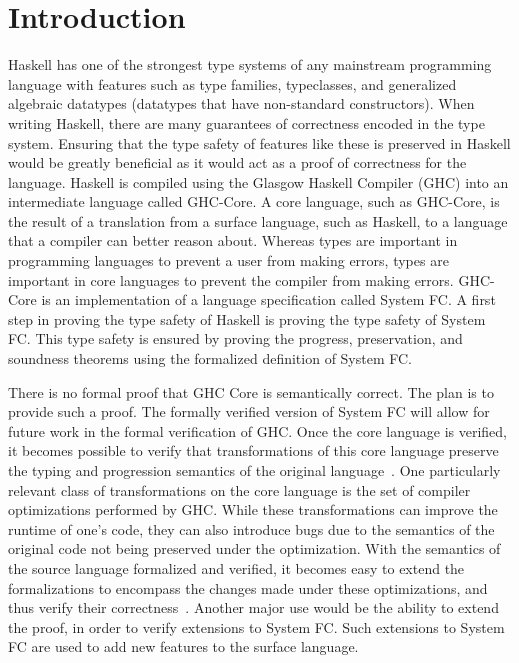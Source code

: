 \documentclass{sig-alternate}
\begin{document}
\section{Introduction}
\label{sec:intro}
Haskell has one of the strongest type systems of any mainstream programming language with features such as type families, typeclasses, and generalized algebraic datatypes (datatypes that have non-standard constructors). When writing Haskell, there are many guarantees of correctness encoded in the type system. Ensuring that the type safety of features like these is preserved in Haskell would be greatly beneficial as it would act as a proof of correctness for the language. Haskell is compiled using the Glasgow Haskell Compiler (GHC) into an intermediate language called GHC-Core. A core language, such as GHC-Core, is the result of a translation from a surface language, such as Haskell, to a language that a compiler can better reason about. Whereas types are important in programming languages to prevent a user from making errors, types are important in core languages to prevent the compiler from making errors. GHC-Core is an implementation of a language specification called System FC. A first step in proving the type safety of Haskell is proving the type safety of System FC. This type safety is ensured by proving the progress, preservation, and soundness theorems using the formalized definition of System FC.



There is no formal proof that GHC Core is semantically correct. The plan is to provide such a proof. The formally verified version of System FC will allow for future work in the formal verification of GHC. Once the core language is verified, it becomes possible to verify that transformations of this core language preserve the typing and progression semantics of the original language~\cite{zhao2013formalizing}. One particularly relevant class of transformations on the core language is the set of compiler optimizations performed by GHC. While these transformations can improve the runtime of one's code, they can also introduce bugs due to the semantics of the original code not being preserved under the optimization. With the semantics of the source language formalized and verified, it becomes easy to extend the formalizations to encompass the changes made under these optimizations, and thus verify their correctness~\cite{Zhao:2012:FLI:2103656.2103709}. Another major use would be the ability to extend the proof, in order to verify extensions to System FC. Such extensions to System FC are used to add new features to the surface language.
\end{document}
